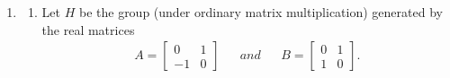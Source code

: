 \documentclass{article}
\begin{document}
\begin{enumerate}
\begin{proof}
      because $AB\neq BA$. From these rules we construct the group
      operation table as follows: \\
      \begin{center}
        \begin{tabular}{|r||r|r|r|r|r|r|r|r|}
          \hline
          $\times$  & $A$   & $-A$  & $B$   & $-B$  & $AB$  & $-AB$ & $I$   & $-I$ \\
          \hline\hline
          $A$       & $-I$  & $I$   & $AB$  & $-AB$ & $-B$  & $B$   & $A$   & $-A$ \\
          \hline
          $-A$      & $I$   & $-I$  & $-AB$ & $AB$  & $B$   & $-B$  & $-A$  & $A$ \\
          \hline
          $B$       & $-AB$ & $AB$  & $-I$  & $I$   & $A$   & $-A$  & $B$   & $-B$ \\
          \hline
          $-B$      & $AB$  & $-AB$ & $I$   & $-I$  & $-A$  & $A$   & $-B$  & $B$ \\
          \hline
          $AB$      & $B$   & $-B$  & $-A$  & $A$   & $-I$  & $I$   & $AB$  & $-AB$ \\
          \hline
          $-AB$     & $-B$  & $B$   & $A$   & $-A$  & $I$   & $-I$  & $-AB$ & $AB$ \\
          \hline
          $I$       & $A$   & $-A$  & $B$   & $-B$  & $AB$  & $-AB$ & $I$   & $-I$ \\
          \hline
          $-I$      & $-A$  & $A$   & $-B$  & $B$   & $-AB$ & $AB$  & $-I$  & $I$ \\
          \hline
        \end{tabular}
      \end{center}
    \end{proof}
  \item \label{part_4}
    \begin{enumerate}
      \item Let $H$ be the group (under ordinary matrix multiplication)
        generated by the real matrices \label{part_a}
        \begin{align*}
          A =
            \begin{bmatrix}
              0   & 1 \\
              -1  & 0
            \end{bmatrix}
            && and &&
          B =
            \begin{bmatrix}
              0   & 1 \\
              1   & 0
            \end{bmatrix}.

\end{align*}
\end{enumerate}
\end{enumerate}
\end{document}
